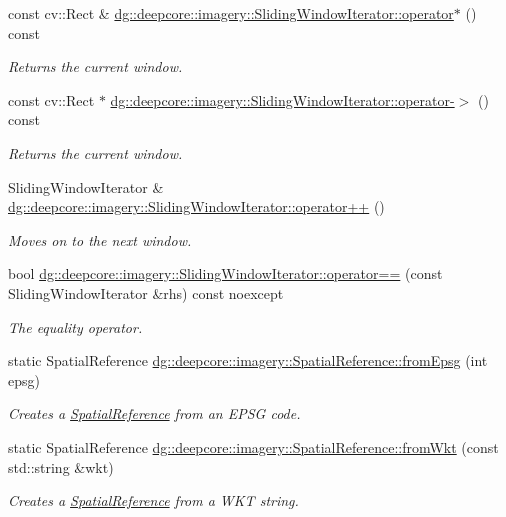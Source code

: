 \begin{DoxyCompactItemize}
const cv\+::\+Rect \& \hyperlink{group___imagery_module_gac4ebab49e1019b197708fa07ddf8a550}{dg\+::deepcore\+::imagery\+::\+Sliding\+Window\+Iterator\+::operator$\ast$} () const 
\begin{DoxyCompactList}\small\item\em Returns the current window. \end{DoxyCompactList}\item 
const cv\+::\+Rect $\ast$ \hyperlink{group___imagery_module_ga72f982e7452565b8b39edcfd3e81e2b8}{dg\+::deepcore\+::imagery\+::\+Sliding\+Window\+Iterator\+::operator-\/$>$} () const 
\begin{DoxyCompactList}\small\item\em Returns the current window. \end{DoxyCompactList}\item 
Sliding\+Window\+Iterator \& \hyperlink{group___imagery_module_ga7b899de397aefb4987bcb989f3cb33d4}{dg\+::deepcore\+::imagery\+::\+Sliding\+Window\+Iterator\+::operator++} ()
\begin{DoxyCompactList}\small\item\em Moves on to the next window. \end{DoxyCompactList}\item 
bool \hyperlink{group___imagery_module_gaf2d1d266e7176885e054f28bbdec7c61}{dg\+::deepcore\+::imagery\+::\+Sliding\+Window\+Iterator\+::operator==} (const Sliding\+Window\+Iterator \&rhs) const noexcept
\begin{DoxyCompactList}\small\item\em The equality operator. \end{DoxyCompactList}\item 
static Spatial\+Reference \hyperlink{group___imagery_module_ga417fb1f2ed62599e7e321d47b3f12121}{dg\+::deepcore\+::imagery\+::\+Spatial\+Reference\+::from\+Epsg} (int epsg)
\begin{DoxyCompactList}\small\item\em Creates a \hyperlink{classdg_1_1deepcore_1_1imagery_1_1_spatial_reference}{Spatial\+Reference} from an E\+P\+SG code. \end{DoxyCompactList}\item 
static Spatial\+Reference \hyperlink{group___imagery_module_ga42fc95755f822f64974facd09edcd716}{dg\+::deepcore\+::imagery\+::\+Spatial\+Reference\+::from\+Wkt} (const std\+::string \&wkt)
\begin{DoxyCompactList}\small\item\em Creates a \hyperlink{classdg_1_1deepcore_1_1imagery_1_1_spatial_reference}{Spatial\+Reference} from a W\+KT string. \end{DoxyCompactList}\item 

\end{DoxyCompactItemize}
